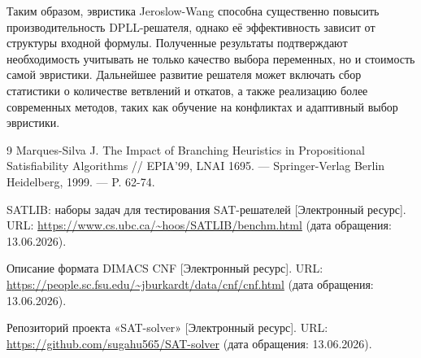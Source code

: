 \documentclass[a4paper]{article}
\begin{document}
Таким образом, эвристика Jeroslow-Wang способна существенно повысить
производительность DPLL-решателя, однако её эффективность зависит от структуры
входной формулы. Полученные результаты подтверждают необходимость учитывать не
только качество выбора переменных, но и стоимость самой эвристики. Дальнейшее
развитие решателя может включать сбор статистики о количестве ветвлений и
откатов, а также реализацию более современных методов, таких как обучение на
конфликтах и адаптивный выбор эвристики.

\renewcommand{\refname}{Список литературы}
\begin{thebibliography}{9}
    Marques-Silva J. The Impact of Branching Heuristics in Propositional Satisfiability Algorithms // EPIA'99, LNAI 1695. --- Springer-Verlag Berlin Heidelberg, 1999. --- P. 62-74.

    SATLIB: наборы задач для тестирования SAT-решателей [Электронный ресурс].
    URL: \url{https://www.cs.ubc.ca/~hoos/SATLIB/benchm.html}
    (дата обращения: 13.06.2026).

    Описание формата DIMACS CNF [Электронный ресурс].
    URL: \url{https://people.sc.fsu.edu/~jburkardt/data/cnf/cnf.html}
    (дата обращения: 13.06.2026).

    Репозиторий проекта «SAT-solver» [Электронный ресурс].
    URL: \url{https://github.com/sugahu565/SAT-solver}
    (дата обращения: 13.06.2026).
\end{thebibliography}
\end{document}
